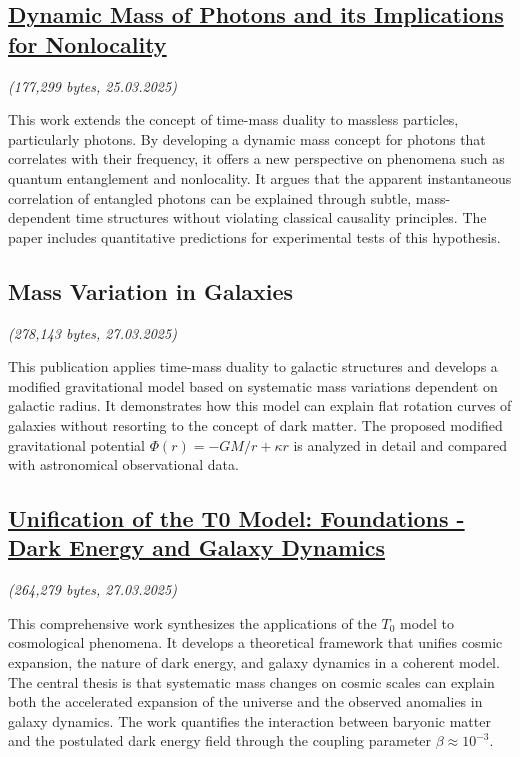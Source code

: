 \documentclass[a4paper,12pt]{article}
\newcommand{\repobase}{https://github.com/jpascher/T0-Time-Mass-Duality/tree/main/2/}
\begin{document}
	\subsection{\href{\repobase pdf/English/Dynamic Mass of Photons and its Implications for Nonlocality.pdf}{Dynamic Mass of Photons and its Implications for Nonlocality}}
	\textit{(177,299 bytes, 25.03.2025)}
	
	This work extends the concept of time-mass duality to massless particles, particularly photons. By developing a dynamic mass concept for photons that correlates with their frequency, it offers a new perspective on phenomena such as quantum entanglement and nonlocality. It argues that the apparent instantaneous correlation of entangled photons can be explained through subtle, mass-dependent time structures without violating classical causality principles. The paper includes quantitative predictions for experimental tests of this hypothesis.
	
	\subsection{Mass Variation in Galaxies}
	\textit{(278,143 bytes, 27.03.2025)}
	
	This publication applies time-mass duality to galactic structures and develops a modified gravitational model based on systematic mass variations dependent on galactic radius. It demonstrates how this model can explain flat rotation curves of galaxies without resorting to the concept of dark matter. The proposed modified gravitational potential $\Phi(r) = -GM/r + \kappa r$ is analyzed in detail and compared with astronomical observational data.
	
	\subsection{\href{\repobase pdf/English/Unification of the T0 Model Foundations - Dark Energy and Galaxy Dynamics.pdf}{Unification of the T0 Model: Foundations - Dark Energy and Galaxy Dynamics}}
	\textit{(264,279 bytes, 27.03.2025)}
	
	This comprehensive work synthesizes the applications of the $T_0$ model to cosmological phenomena. It develops a theoretical framework that unifies cosmic expansion, the nature of dark energy, and galaxy dynamics in a coherent model. The central thesis is that systematic mass changes on cosmic scales can explain both the accelerated expansion of the universe and the observed anomalies in galaxy dynamics. The work quantifies the interaction between baryonic matter and the postulated dark energy field through the coupling parameter $\beta \approx 10^{-3}$.
	
\end{document}
